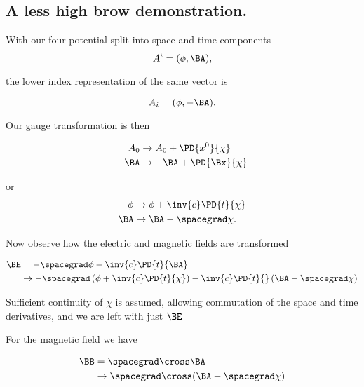\subsection{A less high brow demonstration.}

With our four potential split into space and time components
\begin{equation}\label{eqn:relativisticElectrodynamicsL10:50}
A^i = (\phi, \BA),
\end{equation}

the lower index representation of the same vector is

\begin{equation}\label{eqn:relativisticElectrodynamicsL10:70}
A_i = (\phi, -\BA).
\end{equation}

Our gauge transformation is then

\begin{align}\label{eqn:relativisticElectrodynamicsL10:90}
A_0 &\rightarrow A_0 + \PD{x^0}{\chi} \\
-\BA &\rightarrow -\BA + \PD{\Bx}{\chi}
\end{align}

or
\begin{align}\label{eqn:relativisticElectrodynamicsL10:110}
\phi &\rightarrow \phi + \inv{c}\PD{t}{\chi} \\
\BA &\rightarrow \BA - \spacegrad \chi.
\end{align}

Now observe how the electric and magnetic fields are transformed

\begin{align*}
\BE 
&= - \spacegrad \phi - \inv{c} \PD{t}{\BA} \\
&\rightarrow 
- \spacegrad \left( \phi + \inv{c}\PD{t}{\chi} \right) - \inv{c}\PD{t}{} \left( \BA - \spacegrad \chi \right) \\
\end{align*}

Sufficient continuity of $\chi$ is assumed, allowing commutation of the space and time derivatives, and we are left with just $\BE$

For the magnetic field we have

\begin{align*}
\BB 
&= \spacegrad \cross \BA  \\
&\rightarrow 
\spacegrad \cross (\BA  - \spacegrad \chi) \\
\end{align*}

